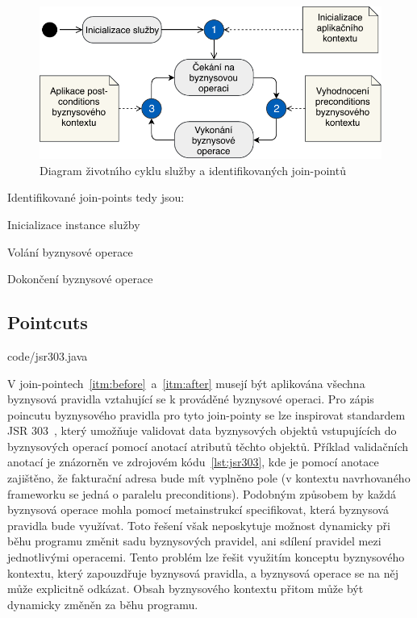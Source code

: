 \begin{figure}
    \centering
    \includegraphics[keepaspectratio=true, width=0.6\linewidth]{figures/join-points.pdf}
    \caption{Diagram životn\'{\i}ho cyklu služby a identifikovan\'ych join-pointů}
    \label{fig:join-points}
\end{figure}

Identifikované join-points tedy jsou:

\benum[label=\circledarabic]
\item\label{itm:initialization} Inicializace instance služby
\item\label{itm:before} Volání byznysové operace
\item\label{itm:after} Dokončení byznysové operace
\eenum

\subsection{Pointcuts}


{code/jsr303.java}

V join-pointech~\ref{itm:before}~a~\ref{itm:after} musejí být aplikována všechna byznysová pravidla
vztahující se k prováděné byznysové operaci.
Pro zápis poincutu byznysového pravidla pro tyto join-pointy se lze inspirovat standardem \gls{JSR}
303~\cite{bernard2009jsr}, který umožňuje validovat data byznysových objektů vstupujících do
byznysových operací pomocí anotací atributů těchto objektů. Příklad validačních anotací je znázorněn
ve zdrojovém kódu~\ref{lst:jsr303}, kde je pomocí anotace  zajištěno, že fakturační
adresa bude mít vyplněno pole  (v kontextu navrhovaného frameworku se jedná o paralelu preconditions).
Podobným způsobem by každá byznysová operace mohla pomocí metainstrukcí specifikovat, která byznysová
pravidla bude využívat. Toto řešení však neposkytuje možnost dynamicky při běhu programu změnit sadu
byznysových pravidel, ani sdílení pravidel mezi jednotlivými operacemi. Tento problém lze řešit využitím
konceptu byznysového kontextu, který zapouzdřuje byznysová pravidla, a byznysová operace se na něj může
explicitně odkázat. Obsah byznysového kontextu přitom může být dynamicky změněn za běhu programu.

